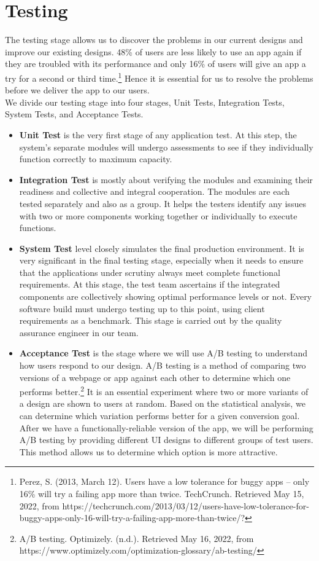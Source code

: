 \section{Testing}
\label{ch2test}
The testing stage allows us to discover the problems in our current designs and improve our existing designs. 
48\% of users are less likely to use an app again if they are troubled with its performance and only 16\% of users will give an app a try for a second or third time.\footnote{Perez, S. (2013, March 12). Users have a low tolerance for buggy apps – only 16\% will try a failing app more than twice. TechCrunch. Retrieved May 15, 2022, from https://techcrunch.com/2013/03/12/users-have-low-tolerance-for-buggy-apps-only-16-will-try-a-failing-app-more-than-twice/?} Hence it is essential for us to resolve the problems before we deliver the app to our users.
\\We divide our testing stage into four stages, Unit Tests, Integration Tests, System Tests, and Acceptance Tests.
\begin{itemize}
\item\textbf{Unit Test} is the very first stage of any application test. At this step, the system’s separate modules will undergo assessments to see if they individually function correctly to maximum capacity. 
\item\textbf{Integration Test} is mostly about verifying the modules and examining their readiness and collective and integral cooperation. The modules are each tested separately and also as a group. It helps the testers identify any issues with two or more components working together or individually to execute functions.
\item\textbf{System Test} level closely simulates the final production environment. It is very significant in the final testing stage, especially when it needs to ensure that the applications under scrutiny always meet complete functional requirements. 
At this stage, the test team ascertains if the integrated components are collectively showing optimal performance levels or not. Every software build must undergo testing up to this point, using client requirements as a benchmark. This stage is carried out by the quality assurance engineer in our team.
\item\textbf{Acceptance Test} is the stage where we will use A/B testing to understand how users respond to our design. 
A/B testing is a method of comparing two versions of a webpage or app against each other to determine which one performs better.\footnote{A/B testing. Optimizely. (n.d.). Retrieved May 16, 2022, from https://www.optimizely.com/optimization-glossary/ab-testing/} It is an essential experiment where two or more variants of a design are shown to users at random. Based on the statistical analysis, we can determine which variation performs better for a given conversion goal.
After we have a functionally-reliable version of the app, 
we will be performing A/B testing by providing different UI designs to different groups of test users. This method allows us to 
determine which option is more attractive.\end{itemize}

